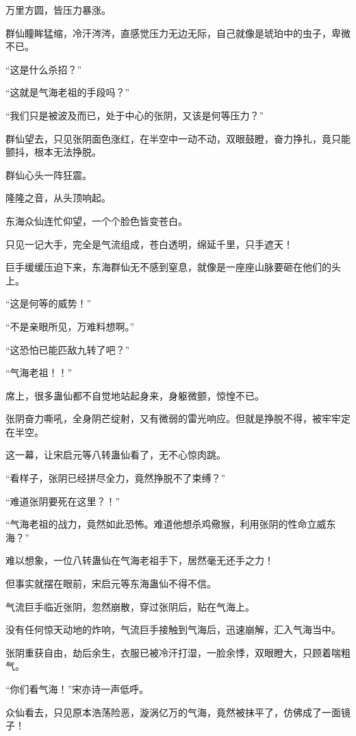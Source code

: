 \begin{this_body}
万里方圆，皆压力暴涨。

群仙瞳眸猛缩，冷汗涔涔，直感觉压力无边无际，自己就像是琥珀中的虫子，卑微不已。

“这是什么杀招？”

“这就是气海老祖的手段吗？”

“我们只是被波及而已，处于中心的张阴，又该是何等压力？”

群仙望去，只见张阴面色涨红，在半空中一动不动，双眼鼓瞪，奋力挣扎，竟只能颤抖，根本无法挣脱。

群仙心头一阵狂震。

隆隆之音，从头顶响起。

东海众仙连忙仰望，一个个脸色皆变苍白。

只见一记大手，完全是气流组成，苍白透明，绵延千里，只手遮天！

巨手缓缓压迫下来，东海群仙无不感到窒息，就像是一座座山脉要砸在他们的头上。

“这是何等的威势！”

“不是亲眼所见，万难料想啊。”

“这恐怕已能匹敌九转了吧？”

“气海老祖！！”

席上，很多蛊仙都不自觉地站起身来，身躯微颤，惊惶不已。

张阴奋力嘶吼，全身阴芒绽射，又有微弱的雷光响应。但就是挣脱不得，被牢牢定在半空。

这一幕，让宋启元等八转蛊仙看了，无不心惊肉跳。

“看样子，张阴已经拼尽全力，竟然挣脱不了束缚？”

“难道张阴要死在这里？！”

“气海老祖的战力，竟然如此恐怖。难道他想杀鸡儆猴，利用张阴的性命立威东海？”

难以想象，一位八转蛊仙在气海老祖手下，居然毫无还手之力！

但事实就摆在眼前，宋启元等东海蛊仙不得不信。

气流巨手临近张阴，忽然崩散，穿过张阴后，贴在气海上。

没有任何惊天动地的炸响，气流巨手接触到气海后，迅速崩解，汇入气海当中。

张阴重获自由，劫后余生，衣服已被冷汗打湿，一脸余悸，双眼瞪大，只顾着喘粗气。

“你们看气海！”宋亦诗一声低呼。

众仙看去，只见原本浩荡险恶，漩涡亿万的气海，竟然被抹平了，仿佛成了一面镜子！


\end{this_body}

